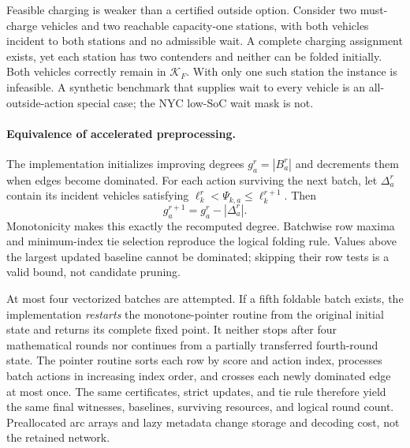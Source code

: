 Feasible charging is weaker than a certified outside option. Consider
two must-charge vehicles and two reachable capacity-one stations, with
both vehicles incident to both stations and no admissible wait. A
complete charging assignment exists, yet each station has two contenders
and neither can be folded initially. Both vehicles correctly remain
in $\mathcal K_F$. With only one such station the instance is
infeasible. A synthetic benchmark that supplies wait to every vehicle
is an all-outside-action special case; the NYC low-SoC wait mask is not.

\paragraph{Equivalence of accelerated preprocessing.}
The implementation initializes improving degrees $g_a^r=|B_a^r|$
and decrements them when edges become dominated. For each action
surviving the next batch, let $\Delta_a^r$ contain its incident
vehicles satisfying $\ell_k^r<\Psi_{k,a}\le\ell_k^{r+1}$. Then
\begin{equation}
g_a^{r+1}=g_a^r-|\Delta_a^r|.
\label{eq:incremental_degree_identity}
\end{equation}
Monotonicity makes this exactly the recomputed degree. Batchwise row
maxima and minimum-index tie selection reproduce the logical folding
rule. Values above the largest updated baseline cannot be dominated;
skipping their row tests is a valid bound, not candidate pruning.

At most four vectorized batches are attempted. If a fifth foldable
batch exists, the implementation \emph{restarts} the monotone-pointer
routine from the original initial state and returns its complete
fixed point. It neither stops after four mathematical rounds nor
continues from a partially transferred fourth-round state. The pointer
routine sorts each row by score and action index, processes batch
actions in increasing index order, and crosses each newly dominated
edge at most once. The same certificates, strict updates, and tie
rule therefore yield the same final witnesses, baselines, surviving
resources, and logical round count. Preallocated arc arrays and lazy
metadata change storage and decoding cost, not the retained network.

